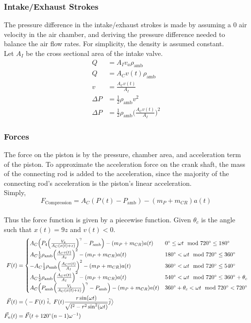 \documentclass[10pt,a4paper]{article}
\begin{document}
\subsubsection*{Intake/Exhaust Strokes}
The pressure difference in the intake/exhaust strokes is made by assuming a 0 air velocity in the air chamber, and deriving the pressure difference needed to balance the air flow rates. For simplicity, the density is assumed constant.\\ Let $A_I$ be the cross sectional area of the intake valve.
\begin{align}
	Q &= A_I v_a \rho_{\text{amb}}\\
	Q &= A_C v(t)\rho_{\text{amb}} \\
	v &= \frac{A_C v(t)}{A_I}\\
	\Delta P &= \frac{1}{2} \rho_{\text{amb}} v^2 \\
	\Delta P &= \frac{1}{2} \rho_{\text{amb}} \Big( \frac{A_C v(t)}{A_I} \Big)^2
\end{align}
\subsubsection*{Forces}
The force on the piston is by the pressure, chamber area, and acceleration term of the piston. To approximate the acceleration force on the crank shaft, the mass of the connecting rod is added to the acceleration, since the majority of the connecting rod's acceleration is the piston's linear acceleration.\\
 Simply, $$F_{\text{Compression}} = A_C (P(t) - P_{\text{amb}}) - (m_P+m_{CR})a(t)$$\\
 Thus the force function is given by a piecewise function. Given $\theta_c$ is the angle such that $x(t) = 9z$ and $v(t) < 0$.
\begin{align}
F(t) &=
\begin{cases}
A_C \Big(P_{4} \Big( \frac{V_4}{A_C (x(t)+z)} \Big)^{\gamma} - P_{\text{amb}}\Big) - (m_P+m_{CR})a(t) & 0^\circ \leq \omega t \mod 720^\circ \leq 180^\circ \\
A_C \frac{1}{2} \rho_{\text{amb}} \Big( \frac{A_C v(t)}{A_I} \Big)^2 - (m_P+m_{CR})a(t) & 180^\circ < \omega t \mod 720^\circ \leq 360^\circ \\
- A_C \frac{1}{2} \rho_{\text{amb}} \Big( \frac{A_C v(t)}{A_I} \Big)^2 - (m_P+m_{CR})a(t) & 360^\circ < \omega t \mod 720^\circ \leq 540^\circ \\
A_C \frac{1}{2} \rho_{\text{amb}} \Big( \frac{A_C v(t)}{A_I} \Big)^2 - (m_P+m_{CR})a(t) & 540^\circ < \omega t \mod 720^\circ \leq 360^\circ + \theta_c \\
A_C \Big( P_{\text{amb}} \Big( \frac{V_1}{A_C (x(t)+z)} \Big)^{\gamma}- P_{\text{amb}}\Big) - (m_P+m_{CR})a(t) & 360^\circ + \theta_c < \omega t \mod 720^\circ < 720^\circ \\
\end{cases}\\
\vec{F}(t) &= \big \langle -F(t)\ \hat{i},\ F(t) \frac{r \sin(\omega t)}{\sqrt{l^2 - r^2 \sin^2(\omega t)}}  \hat{j} \big \rangle\\
\vec{F}_n(t) &= \vec{F}(t + 120 \degree (n-1)\omega^{-1})
\end{align} 
\end{document}
